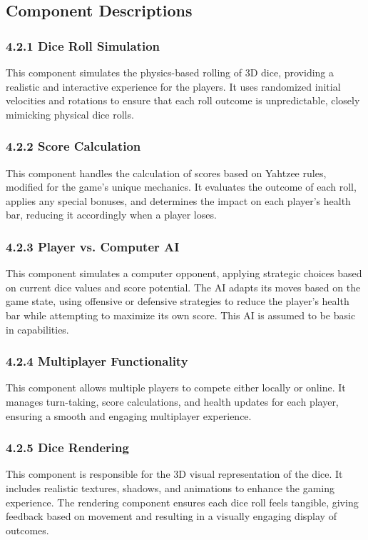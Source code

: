 \documentclass{article}
\begin{document}
\subsection{Component Descriptions}

\subsubsection*{4.2.1 Dice Roll Simulation} \label{DRS}
This component simulates the physics-based rolling of 3D dice, providing a realistic and interactive experience for the players. It uses randomized initial velocities and rotations to ensure that each roll outcome is unpredictable, closely mimicking physical dice rolls.

\subsubsection*{4.2.2 Score Calculation} \label{SC}
This component handles the calculation of scores based on Yahtzee rules, modified for the game's unique mechanics. It evaluates the outcome of each roll, applies any special bonuses, and determines the impact on each player's health bar, reducing it accordingly when a player loses.

\subsubsection*{4.2.3 Player vs. Computer AI} \label{PVC}
This component simulates a computer opponent, applying strategic choices based on current dice values and score potential. The AI adapts its moves based on the game state, using offensive or defensive strategies to reduce the player's health bar while attempting to maximize its own score. This AI is assumed to be basic in capabilities.

\subsubsection*{4.2.4 Multiplayer Functionality} \label{MF}
This component allows multiple players to compete either locally or online. It manages turn-taking, score calculations, and health updates for each player, ensuring a smooth and engaging multiplayer experience.

\subsubsection*{4.2.5 Dice Rendering} \label{DR}
This component is responsible for the 3D visual representation of the dice. It includes realistic textures, shadows, and animations to enhance the gaming experience. The rendering component ensures each dice roll feels tangible, giving feedback based on movement and resulting in a visually engaging display of outcomes.
\end{document}
